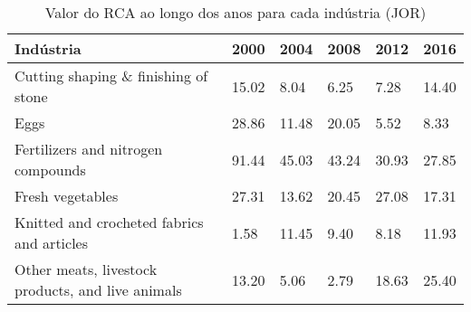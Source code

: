 \begin{table}
\centering
\caption{Valor do RCA ao longo dos anos para cada indústria (JOR)}
\label{tab:ex3-tempo-JOR}
\begin{tabular}{p{6cm}p{1.5cm}p{1.5cm}p{1.5cm}p{1.5cm}p{1.5cm}}
\toprule
                                        Indústria &  2000 &  2004 &  2008 &  2012 &  2016 \\
\midrule
             Cutting shaping \& finishing of stone & 15.02 &  8.04 &  6.25 &  7.28 & 14.40 \\
                                             Eggs & 28.86 & 11.48 & 20.05 &  5.52 &  8.33 \\
               Fertilizers and nitrogen compounds & 91.44 & 45.03 & 43.24 & 30.93 & 27.85 \\
                                 Fresh vegetables & 27.31 & 13.62 & 20.45 & 27.08 & 17.31 \\
       Knitted and crocheted fabrics and articles &  1.58 & 11.45 &  9.40 &  8.18 & 11.93 \\
Other meats, livestock products, and live animals & 13.20 &  5.06 &  2.79 & 18.63 & 25.40 \\
\bottomrule
\end{tabular}
\end{table}
